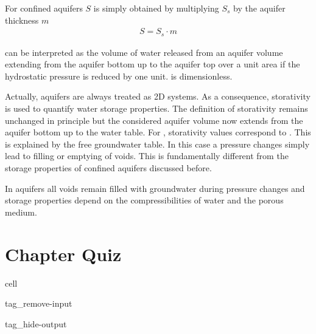 \documentclass[letterpaper,10pt,english]{jupyterBook}
\let\sphinxpxdimen\pdfpxdimen\else\newdimen\sphinxpxdimen
\begin{document}
\sphinxAtStartPar
For confined aquifers \(S\) is simply obtained by multiplying \(S_s\) by the aquifer thickness \(m\)
\begin{equation*}
\begin{split}
S = S_s \cdot m
\end{split}
\end{equation*}
\noindent{\hspace*{\fill}\sphinxincludegraphics[width=600\sphinxpxdimen]{{L03_f_14}.png}\hspace*{\fill}}

\sphinxAtStartPar
{} can be interpreted as the volume of water released from an aquifer volume extending from the aquifer bottom up to the aquifer top over a unit area if the hydrostatic pressure is reduced by one unit.  is dimensionless.

\sphinxAtStartPar
Actually,  aquifers are always treated as 2D systems. As a consequence, storativity is used to quantify water storage properties. The definition of storativity remains unchanged in principle but the considered aquifer volume now extends from the aquifer bottom up to the water table. For , storativity values correspond to . This is explained by the free groundwater table. In this case a pressure changes simply lead to filling or emptying of voids. This is fundamentally different from the storage properties of confined aquifers discussed before.

\sphinxAtStartPar
In  aquifers all voids remain filled with groundwater during pressure changes and storage properties depend on the compressibilities of water and the porous medium.


\section{Chapter Quiz}
\label{\detokenize{content/flow/L3/13_gw_storage:chapter-quiz}}
\begin{sphinxuseclass}{cell}
\begin{sphinxuseclass}{tag_remove-input}
\begin{sphinxuseclass}{tag_hide-output}
\end{sphinxuseclass}
\end{sphinxuseclass}
\end{sphinxuseclass}
\sphinxstepscope
\end{document}
